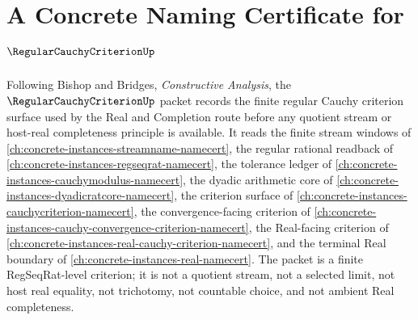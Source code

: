 \chapter{A Concrete Naming Certificate for $\RegularCauchyCriterionUp$}
\label{ch:concrete-instances-regularcauchycriterion-namecert}

Following Bishop and Bridges, \emph{Constructive Analysis}, the $\RegularCauchyCriterionUp$ packet records the finite regular Cauchy criterion surface used by the Real and Completion route before any quotient stream or host-real completeness principle is available. It reads the finite stream windows of \autoref{ch:concrete-instances-streamname-namecert}, the regular rational readback of \autoref{ch:concrete-instances-regseqrat-namecert}, the tolerance ledger of \autoref{ch:concrete-instances-cauchymodulus-namecert}, the dyadic arithmetic core of \autoref{ch:concrete-instances-dyadicratcore-namecert}, the criterion surface of \autoref{ch:concrete-instances-cauchycriterion-namecert}, the convergence-facing criterion of \autoref{ch:concrete-instances-cauchy-convergence-criterion-namecert}, the Real-facing criterion of \autoref{ch:concrete-instances-real-cauchy-criterion-namecert}, and the terminal Real boundary of \autoref{ch:concrete-instances-real-namecert}. The packet is a finite RegSeqRat-level criterion; it is not a quotient stream, not a selected limit, not host real equality, not trichotomy, not countable choice, and not ambient Real completeness.

